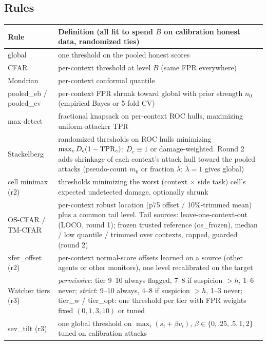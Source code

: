 \documentclass[11pt]{article}
\begin{document}
\subsection{Rules}
\begin{table}[!htb]\centering\small
\begin{tabularx}{\linewidth}{@{}>{\raggedright\arraybackslash}p{3.0cm}X@{}}
\toprule
Rule & Definition (all fit to spend $B$ on calibration honest data, randomized ties)\\
\midrule
global & one threshold on the pooled honest scores\\
CFAR & per-context threshold at level $B$ (same FPR everywhere)\\
Mondrian & per-context conformal quantile\\
pooled\_eb / pooled\_cv & per-context FPR shrunk toward global with prior strength $n_0$ (empirical Bayes or 5-fold CV)\\
max-detect & fractional knapsack on per-context ROC hulls, maximizing uniform-attacker TPR\\
Stackelberg & randomized thresholds on ROC hulls minimizing $\max_c D_c(1-\mathrm{TPR}_c)$; $D_c\equiv1$ or damage-weighted. Round 2 adds shrinkage of each context's attack hull toward the pooled attacks (pseudo-count $m_0$ or fraction $\lambda$; $\lambda=1$ gives global)\\
cell minimax (r2) & thresholds minimizing the worst (context $\times$ side task) cell's expected undetected damage, optionally shrunk\\
OS-CFAR / TM-CFAR & per-context robust location (p75 offset / 10\%-trimmed mean) plus a common tail level. Tail sources: leave-one-context-out (LOCO, round 1); frozen trusted reference (os\_frozen), median / low quantile / trimmed over contexts, capped, guarded (round 2)\\
xfer\_offset (r2) & per-context normal-score offsets learned on a source (other agents or other monitors), one level recalibrated on the target\\
Watcher tiers (r3) & \emph{permissive}: tier 9--10 always flagged, 7--8 if suspicion $>h$, 1--6 never; \emph{strict}: 9--10 always, 4--8 if suspicion $>h$, 1--3 never; tier\_w / tier\_opt: one threshold per tier with FPR weights fixed $(0,1,3,10)$ or tuned\\
sev\_tilt (r3) & one global threshold on $\max_i(s_i+\beta v_i)$, $\beta\in\{0,.25,.5,1,2\}$ tuned on calibration attacks\\
\bottomrule
\end{tabularx}
\end{table}
\end{document}
